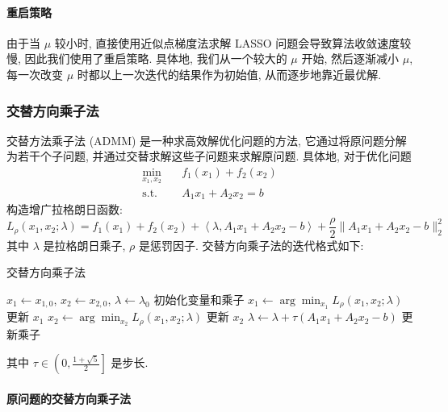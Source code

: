 \documentclass{article}
\begin{document}
\paragraph{重启策略}

由于当 $\mu$ 较小时, 直接使用近似点梯度法求解 LASSO 问题会导致算法收敛速度较慢, 因此我们使用了重启策略. 具体地, 我们从一个较大的 $\mu$ 开始, 然后逐渐减小 $\mu$, 每一次改变 $\mu$ 时都以上一次迭代的结果作为初始值, 从而逐步地靠近最优解.

\subsubsection{交替方向乘子法}

交替方法乘子法 (ADMM) 是一种求高效解优化问题的方法, 它通过将原问题分解为若干个子问题, 并通过交替求解这些子问题来求解原问题. 具体地, 对于优化问题
\begin{equation*}
    \begin{aligned}
        \min_{x_1, x_2}\quad & f_1(x_1) + f_2(x_2)\\
        \text{s.t.}\quad & A_1 x_1 + A_2 x_2 = b
    \end{aligned}
\end{equation*}
构造增广拉格朗日函数:
\begin{equation*}
    L_\rho(x_1, x_2; \lambda) = f_1(x_1) + f_2(x_2) + \left<\lambda, A_1 x_1 + A_2 x_2 - b\right> + \frac{\rho}{2}\|A_1 x_1 + A_2 x_2 - b\|_2^2
\end{equation*}
其中 $\lambda$ 是拉格朗日乘子, $\rho$ 是惩罚因子. 交替方向乘子法的迭代格式如下:
\begin{algorithm}
    \caption{交替方向乘子法}
    \begin{algorithmic}
        \State $x_1 \gets x_{1,0}$, $x_2 \gets x_{2,0}$, $\lambda \gets \lambda_0$ \Comment 初始化变量和乘子
        \State $x_1 \gets \arg \min_{x_1} L_\rho(x_1,x_2;\lambda)$ \Comment 更新 $x_1$
        \State $x_2 \gets \arg \min_{x_2} L_\rho(x_1,x_2;\lambda)
        $ \Comment 更新 $x_2$
        \State $\lambda \gets \lambda + \tau(A_1 x_1 + A_2 x_2 - b)$ \Comment 更新乘子
        \EndWhile
    \end{algorithmic}
\end{algorithm}
\newline
其中 $\tau\in \left(0,\frac{1+\sqrt{5}}{2}\right]$ 是步长.

\paragraph{原问题的交替方向乘子法}
\end{document}
